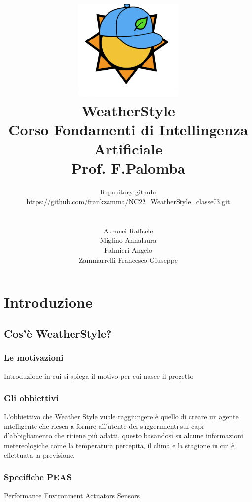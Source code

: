 \documentclass[a4paper, 11pt, oneside]{report}
\title{\includegraphics[width=0.4\textwidth]{logo}\\WeatherStyle\\Corso Fondamenti di Intellingenza Artificiale\\Prof. F.Palomba}
\author{Repository github:\\\url{https://github.com/frankzamma/NC22_WeatherStyle_classe03.git}\\\\
        \\Aurucci Raffaele\\Miglino Annalaura\\Palmieri Angelo\\Zammarrelli Francesco Giuseppe}
\date{}
\begin{document}
    \begin{titlepage}
        \maketitle
    \end{titlepage}

    \tableofcontents

    \part{Introduzione}
        \chapter{Cos'è WeatherStyle?}

            \section{Le motivazioni}
            Introduzione in cui si spiega il motivo per cui nasce il progetto

            \section{Gli obbiettivi}
            L'obbiettivo che Weather Style vuole raggiungere è quello di creare un agente intelligente che riesca a fornire
            all'utente dei suggerimenti sui capi d'abbigliamento che ritiene più adatti, questo basandosi su alcune informazioni
            metereologiche come la temperatura percepita, il clima e la stagione in cui è effettuata la previsione.

            \section{Specifiche PEAS}
            Performance Environment Actuators Sensors
\end{document}
